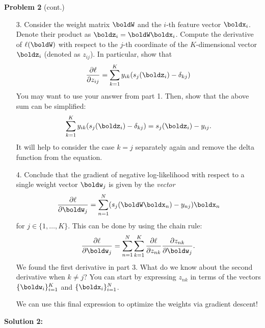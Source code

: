 \documentclass[submit]{harvardml}
\begin{document}
\begin{framed}
\noindent\textbf{Problem 2} (cont.)\\
\begin{enumerate}
    \item[3.] Consider the weight matrix $\boldW$ and the $i$-th feature vector $\boldx_i$. Denote their product as $\boldz_i = \boldW\boldx_i$. Compute the derivative of $\ell(\boldW)$ with respect to the $j$-th coordinate of the $K$-dimensional vector $\boldz_i$ (denoted as $z_{ij}$). In particular, show that 
    $$
    \frac{\partial \ell}{\partial z_{ij}} = \sum_{k = 1}^K y_{ik}(s_j(\boldz_i) - \delta_{kj})
    $$
    You may want to use your answer from part 1. Then, show that the above sum can be simplified:
    $$
    \sum_{k = 1}^K y_{ik}(s_j(\boldz_i) - \delta_{kj}) = s_j(\boldz_i) - y_{ij}.
    $$
    It will help to consider the case $k = j$ separately again and remove the delta function from the equation.
    \item[4.] Conclude that the gradient of negative log-likelihood with respect to a single weight vector $\boldw_j$ is given by the \textit{vector}
    $$
    \frac{\partial \ell}{\partial \boldw_j} = \sum_{n = 1}^N(s_j(\boldW\boldx_n) - y_{nj})\boldx_n
    $$
    for $j \in \{1, \dots, K\}$. This can be done by using the chain rule:
    $$
    \frac{\partial \ell}{\partial \boldw_j} = \sum_{n = 1}^N\sum_{k = 1}^K\frac{\partial \ell}{\partial z_{nk}}\frac{\partial z_{nk}}{\partial \boldw_j}.
    $$
    We found the first derivative in part 3. What do we know about the second derivative when $k \neq j$? You can start by expressing $z_{nk}$ in terms of the vectors $\{\boldw_i\}_{i=1}^K$ and $\{\boldx_i\}_{i=1}^N$.
    
    We can use this final expression to optimize the weights via gradient descent!
\end{enumerate}
\end{framed}

\pagebreak

\textbf{Solution 2:}
\end{document}
